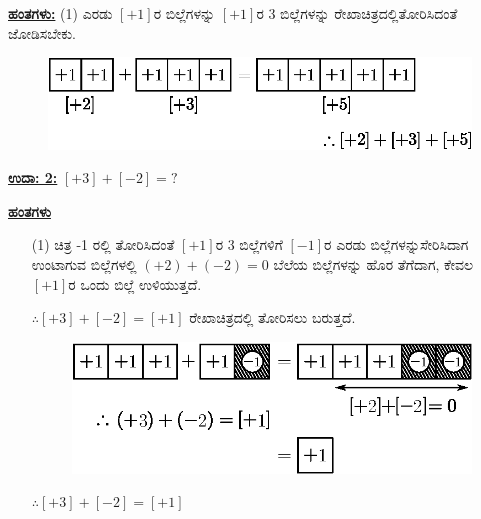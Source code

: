 \noindent
{\textbf{\underline{ಹಂತಗಳು:}}} (1) ಎರಡು $[+1]$ರ ಬಿಲ್ಲೆಗಳನ್ನು $[+1]$ರ 3 ಬಿಲ್ಲೆಗಳನ್ನು ರೇಖಾಚಿತ್ರದಲ್ಲಿ\break ತೋರಿಸಿದಂತೆ ಜೋಡಿಸಬೇಕು.

\begin{figure}[H]
\centering
\includegraphics[scale=0.8]{src/figure/chap3/fig3-8b.eps}
\end{figure}

\eject

\noindent
{\textbf{\underline{ಉದಾ: 2:}}} $[+3] + [-2] = ?$

\noindent
{\textbf{\underline{ಹಂತಗಳು}}} 
\begin{itemize}
\item[(1)] ಚಿತ್ರ -1 ರಲ್ಲಿ ತೋರಿಸಿದಂತೆ $[+1]$ರ 3 ಬಿಲ್ಲೆಗಳಿಗೆ $[-1]$ರ ಎರಡು ಬಿಲ್ಲೆಗಳನ್ನು\break ಸೇರಿಸಿದಾಗ ಉಂಟಾಗುವ ಬಿಲ್ಲೆಗಳಲ್ಲಿ $(+2) + (-2) = 0$ ಬೆಲೆಯ ಬಿಲ್ಲೆಗಳನ್ನು ಹೊರ ತೆಗೆದಾಗ, ಕೇವಲ $[+1]$ರ ಒಂದು ಬಿಲ್ಲೆ ಉಳಿಯುತ್ತದೆ.

$\therefore [+3] + [-2] = [+1]$ ರೇಖಾಚಿತ್ರದಲ್ಲಿ ತೋರಿಸಲು ಬರುತ್ತದೆ.
\begin{figure}[H]
\centering
\includegraphics[scale=0.8]{src/figure/chap3/fig3-9b.eps}
\end{figure}

$\therefore [+3] + [-2] = [+1]$
\end{itemize}

